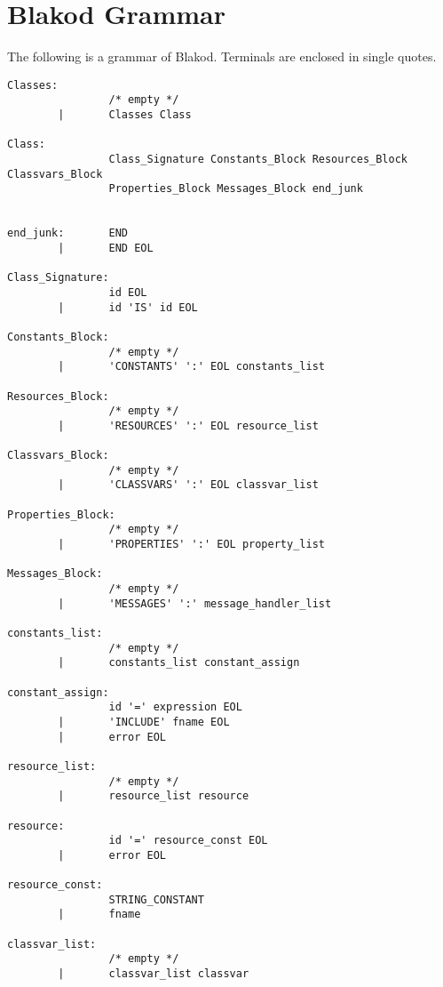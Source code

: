 \chapter{Blakod Grammar}
\label{app:grammar}

The following is a grammar of Blakod.  Terminals are enclosed in single quotes.

\begin{verbatim}
Classes: 
                /* empty */        
        |       Classes Class        

Class:
                Class_Signature Constants_Block Resources_Block Classvars_Block 
                Properties_Block Messages_Block end_junk
                

end_junk:       END 
        |       END EOL

Class_Signature:
                id EOL                
        |       id 'IS' id EOL        

Constants_Block:
                /* empty */                                
        |       'CONSTANTS' ':' EOL constants_list      

Resources_Block:
                /* empty */
        |       'RESOURCES' ':' EOL resource_list
 
Classvars_Block:
                /* empty */                        
        |       'CLASSVARS' ':' EOL classvar_list 

Properties_Block:
                /* empty */                        
        |       'PROPERTIES' ':' EOL property_list

Messages_Block:
                /* empty */                                
        |       'MESSAGES' ':' message_handler_list        

constants_list: 
                /* empty */                        
        |       constants_list constant_assign  

constant_assign:
                id '=' expression EOL
        |       'INCLUDE' fname EOL    
        |       error EOL                

resource_list:
                /* empty */                
        |       resource_list resource  

resource:
                id '=' resource_const EOL
        |       error EOL                        

resource_const:
                STRING_CONSTANT 
        |       fname                

classvar_list:
                /* empty */                
        |       classvar_list classvar         


\end{verbatim}
